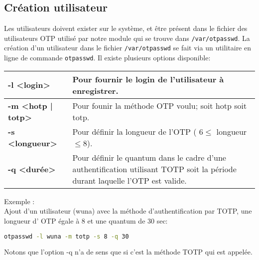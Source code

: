 \documentclass{"../../../res/univ-projet"}
\begin{document}
\subsection{Création utilisateur}
Les utilisateurs doivent exister sur le système, et être présent dans 
le fichier des utilisateurs OTP utilisé par notre module qui se trouve 
dans \verb?/var/otpasswd?. La création d'un utilisateur dans le fichier 
\verb?/var/otpasswd? se fait via un utilitaire en ligne de commande 
\verb?otpasswd?. Il existe plusieurs options disponible:
\newline
\begin{tabular}{|p{}p{}|}
\hline
\textbf{-l <login>} & Pour fournir le login de l'utilisateur à enregistrer.\\
\hline
\textbf{-m <hotp | totp>} & Pour founir la méthode OTP voulu; soit hotp soit totp.\\
\hline
\textbf{-s <longueur>} & Pour définir la longueur de l'OTP ( $6 \leq$ longueur $\leq 8$).\\
\hline
\textbf{-q <durée>} & Pour définir le quantum dans le cadre d'une authentification utilisant 
TOTP soit la période durant laquelle l'OTP est valide.\\
\hline
\end{tabular}

Exemple :\\
Ajout d'un utilisateur (wuna) avec la méthode d'authentification par TOTP, une longueur d'
OTP égale à 8 et une quantum de 30 sec:
\begin{lstlisting}[language=bash, backgroundcolor=\color{black}, basicstyle=\color{white}]
otpasswd -l wuna -m totp -s 8 -q 30
\end{lstlisting}
Notons que l'option -q n'a de sens que si c'est la méthode TOTP qui est appelée.\\
\end{document}
